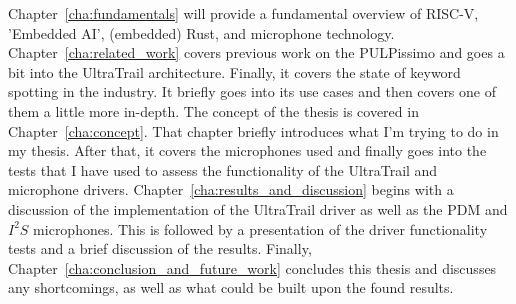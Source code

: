 Chapter~\ref{cha:fundamentals} will provide a fundamental overview of RISC-V, 'Embedded AI', (embedded) Rust, and microphone technology.\\
Chapter~\ref{cha:related_work} covers previous work on the PULPissimo \cite{pulpissimo} and goes a bit into the UltraTrail architecture.
Finally, it covers the state of keyword spotting in the industry.
It briefly goes into its use cases and then covers one of them a little more in-depth.
The concept of the thesis is covered in Chapter~\ref{cha:concept}.
That chapter briefly introduces what I'm trying to do in my thesis.
After that, it covers the microphones used and finally goes into the tests that I have used
to assess the functionality of the UltraTrail and microphone drivers.
Chapter~\ref{cha:results_and_discussion} begins with a discussion of the implementation
of the UltraTrail driver as well as the PDM and $I^2S$ microphones.
This is followed by a presentation of the driver functionality tests and a brief discussion of the results.
Finally, Chapter~\ref{cha:conclusion_and_future_work} concludes this thesis and discusses any shortcomings,
as well as what could be built upon the found results.
